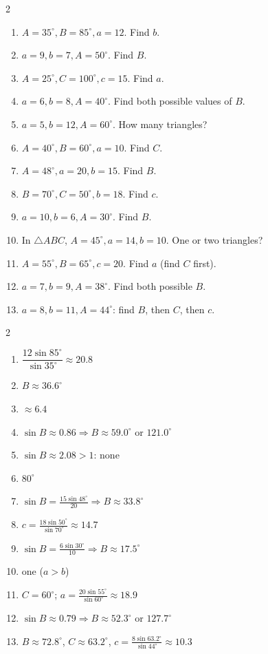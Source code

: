 \documentclass[11pt]{article}
\begin{document}
\begin{recapbox}
\begin{multicols}{2}
\small
\begin{enumerate}[leftmargin=*,itemsep=3pt]
  \item $A=35^\circ,B=85^\circ,a=12$. Find $b$.
  \item $a=9,b=7,A=50^\circ$. Find $B$.
  \item $A=25^\circ,C=100^\circ,c=15$. Find $a$.
  \item $a=6,b=8,A=40^\circ$. Find both possible values of $B$.
  \item $a=5,b=12,A=60^\circ$. How many triangles?
  \item $A=40^\circ,B=60^\circ,a=10$. Find $C$.
  \item $A=48^\circ,a=20,b=15$. Find $B$.
  \item $B=70^\circ,C=50^\circ,b=18$. Find $c$.
  \item $a=10,b=6,A=30^\circ$. Find $B$.
  \item In $\triangle ABC$, $A=45^\circ,a=14,b=10$. One or two triangles?
  \item $A=55^\circ,B=65^\circ,c=20$. Find $a$ (find $C$ first).
  \item $a=7,b=9,A=38^\circ$. Find both possible $B$.
  \item $a=8,b=11,A=44^\circ$: find $B$, then $C$, then $c$.
\end{enumerate}
\end{multicols}
\end{recapbox}

\begin{keybox}
\begin{multicols}{2}
\small
\begin{enumerate}[leftmargin=*,itemsep=3pt]
  \item $\dfrac{12\sin85^\circ}{\sin35^\circ}\approx20.8$
  \item $B\approx36.6^\circ$
  \item $\approx6.4$
  \item $\sin B\approx0.86\Rightarrow B\approx59.0^\circ$ or $121.0^\circ$
  \item $\sin B\approx2.08>1$: none
  \item $80^\circ$
  \item $\sin B=\tfrac{15\sin48^\circ}{20}\Rightarrow B\approx33.8^\circ$
  \item $c=\tfrac{18\sin50^\circ}{\sin70^\circ}\approx14.7$
  \item $\sin B=\tfrac{6\sin30^\circ}{10}\Rightarrow B\approx17.5^\circ$
  \item one ($a>b$)
  \item $C=60^\circ$; $a=\tfrac{20\sin55^\circ}{\sin60^\circ}\approx18.9$
  \item $\sin B\approx0.79\Rightarrow B\approx52.3^\circ$ or $127.7^\circ$
  \item $B\approx72.8^\circ$, $C\approx63.2^\circ$, $c=\tfrac{8\sin63.2^\circ}{\sin44^\circ}\approx10.3$
\end{enumerate}
\end{multicols}
\end{keybox}
\end{document}
